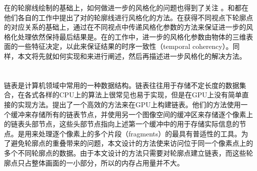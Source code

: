 在\stc{}的轮廓线绘制的基础上，如何做进一步的风格化的问题也得到了关注\cite{northrup2000artistic,kalnins2003coherent} 。\citeauthor{kim2013stereoscopic}和\citeauthor{bukenberger2018stereo}都在他们各自的工作中提出了对\stc{}的轮廓线进行风格化的方法。在获得不同视点下轮廓点的对应关系的基础上，\citeauthor{kim2013stereoscopic}通过在不同视点中传递风格化参数的方法来保证进一步的风格化处理依然保持最后结果是\stc{}。在\citeauthor{bukenberger2018stereo}的工作中，进一步的风格化参数由物体的三维表面的一些特征决定，以此来保证结果的时序一致性（temporal coherency）。同样，本文将先就如何实现\stc{}\con{}和\scon{}来进行阐述，然后再描述进一步风格化的解决方法。

\section{\ppll{}}

链表是计算机领域中常用的一种数据结构。链表往往用于存储不定长度的数据集合，在各式各样的CPU上的算法上很常见也易于实现，但是在GPU上没有简单直接的实现方法。\citeauthor{yang2010real}提出了一个高效的方法\cite{yang2010real}来在GPU上构建链表。他们的方法使用一个缓冲来存储所有的链表节点，并使用另一个图像空间的缓冲区来存储逐个像素上的链表头部节点，这些头部节点指向上述第一个缓冲中的用于存储实际信息的节点。\ppll{}是用来处理逐个像素上的多个片段（fragments）的最具有普适性的工具。为了避免轮廓点的重叠带来的问题，本文设计的方法使\ppll{}来访问位于同一个像素点上的多个不同轮廓点的数据。由于本文设计的方法只需要对轮廓点建立链表，而这些轮廓点只占整体画面的一小部分，所以\ppll{}的内存占用量并不大。